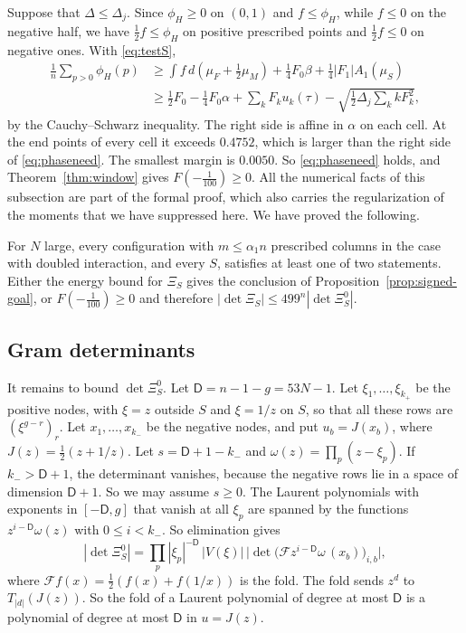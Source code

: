 Suppose that $\Delta\le\Delta_j$. Since $\phi_H\ge0$ on $(0,1)$ and $f\le\phi_H$, while $f\le0$ on the negative
half, we have $\frac12f\le\phi_H$ on positive prescribed points and $\frac12f\le0$ on negative ones. With
\eqref{eq:testS},
\begin{align*}
 \frac1n\sum_{p>0}\phi_H(p)&\ge\int f\,d(\mu_F+\tfrac12\mu_M)+\tfrac14F_0\beta+\tfrac14|F_1|A_1(\mu_S)\\
 &\ge\tfrac12F_0-\tfrac14F_0\alpha+\sum_kF_ku_k(\tau)-\sqrt{\tfrac12\Delta_j\sum_kkF_k^2},
\end{align*}
by the Cauchy--Schwarz inequality. The right side is affine in $\alpha$ on each cell. At the end points of every cell it exceeds
$0.4752$, which is larger than the right side of \eqref{eq:phaseneed}. The smallest margin is $0.0050$. So \eqref{eq:phaseneed} holds, and
Theorem~\ref{thm:window} gives $F(-\frac1{100})\ge0$. All the numerical facts of this subsection are part of the formal proof, which also carries the regularization of the moments that we have suppressed here. We have proved the following.

\begin{proposition}\label{prop:alternative}
For $N$ large, every configuration with $m\le\alpha_1n$ prescribed columns in the case with doubled interaction, and
every $S$, satisfies at least one of two statements. Either the energy bound for $\Xi_S$ gives the conclusion
of Proposition~\ref{prop:signed-goal}, or $F(-\frac1{100})\ge0$ and therefore
$|\det\Xi_S|\le499^n|\det\Xi^0_S|$.
\end{proposition}

\subsection{Gram determinants}\label{ssec:gram}
It remains to bound $\det\Xi^0_S$. Let $\mathsf D=n-1-g=53N-1$. Let $\xi_1,\ldots,\xi_{k_+}$ be the positive nodes, with
$\xi=z$ outside $S$ and $\xi=1/z$ on $S$, so that all these rows are $(\xi^{g-r})_r$. Let $x_1,\ldots,x_{k_-}$ be the
negative nodes, and put $u_b=J(x_b)$, where $J(z)=\frac12(z+1/z)$. Let $s=\mathsf D+1-k_-$ and $\omega(z)=\prod_p(z-\xi_p)$. If
$k_->\mathsf D+1$, the determinant vanishes, because the negative rows lie in a space of dimension $\mathsf D+1$. So we may assume
$s\ge0$. The Laurent polynomials with exponents in $[-\mathsf D,g]$ that vanish at all $\xi_p$ are spanned by the functions
$z^{i-\mathsf D}\omega(z)$ with $0\le i<k_-$. So elimination gives
\begin{equation}\label{eq:split}
 |\det\Xi^0_S|=\prod_p|\xi_p|^{-\mathsf D}\,|V(\xi)|\,\bigl|\det\bigl(\mathcal Fz^{i-\mathsf D}\omega\,(x_b)\bigr)_{i,b}\bigr|,
\end{equation}
where $\mathcal Ff(x)=\frac12(f(x)+f(1/x))$ is the fold. The fold sends $z^d$ to $T_{|d|}(J(z))$. So the fold of a Laurent
polynomial of degree at most $\mathsf D$ is a polynomial of degree at most $\mathsf D$ in $u=J(z)$.

